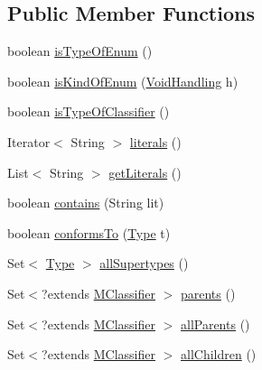 \subsection*{Public Member Functions}
\begin{DoxyCompactItemize}
\item 
boolean \hyperlink{classorg_1_1tzi_1_1use_1_1uml_1_1ocl_1_1type_1_1_enum_type_ae8f0daa3894369910d2a4749cc2b0f83}{is\-Type\-Of\-Enum} ()
\item 
boolean \hyperlink{classorg_1_1tzi_1_1use_1_1uml_1_1ocl_1_1type_1_1_enum_type_a889d3fceea727e072ff199fd786c298f}{is\-Kind\-Of\-Enum} (\hyperlink{enumorg_1_1tzi_1_1use_1_1uml_1_1ocl_1_1type_1_1_type_1_1_void_handling}{Void\-Handling} h)
\item 
boolean \hyperlink{classorg_1_1tzi_1_1use_1_1uml_1_1ocl_1_1type_1_1_enum_type_a807576cf233150cf791f642be43ac423}{is\-Type\-Of\-Classifier} ()
\item 
Iterator$<$ String $>$ \hyperlink{classorg_1_1tzi_1_1use_1_1uml_1_1ocl_1_1type_1_1_enum_type_aecbe55da61a60059f21641fc7b341079}{literals} ()
\item 
List$<$ String $>$ \hyperlink{classorg_1_1tzi_1_1use_1_1uml_1_1ocl_1_1type_1_1_enum_type_a4abd604844fa7746682e0de826368fe6}{get\-Literals} ()
\item 
boolean \hyperlink{classorg_1_1tzi_1_1use_1_1uml_1_1ocl_1_1type_1_1_enum_type_a0996cdc9b8a826cb3a49adc59bbbe194}{contains} (String lit)
\item 
boolean \hyperlink{classorg_1_1tzi_1_1use_1_1uml_1_1ocl_1_1type_1_1_enum_type_a03d9a2fc04a42e03247f7a7f462216ec}{conforms\-To} (\hyperlink{interfaceorg_1_1tzi_1_1use_1_1uml_1_1ocl_1_1type_1_1_type}{Type} t)
\item 
Set$<$ \hyperlink{interfaceorg_1_1tzi_1_1use_1_1uml_1_1ocl_1_1type_1_1_type}{Type} $>$ \hyperlink{classorg_1_1tzi_1_1use_1_1uml_1_1ocl_1_1type_1_1_enum_type_ab045b41876bebee83db4828508d1dacb}{all\-Supertypes} ()
\item 
Set$<$?extends \hyperlink{interfaceorg_1_1tzi_1_1use_1_1uml_1_1mm_1_1_m_classifier}{M\-Classifier} $>$ \hyperlink{classorg_1_1tzi_1_1use_1_1uml_1_1ocl_1_1type_1_1_enum_type_af66e823107a4ea60aaba62cca146c895}{parents} ()
\item 
Set$<$?extends \hyperlink{interfaceorg_1_1tzi_1_1use_1_1uml_1_1mm_1_1_m_classifier}{M\-Classifier} $>$ \hyperlink{classorg_1_1tzi_1_1use_1_1uml_1_1ocl_1_1type_1_1_enum_type_ac9c30f1adfd6ead231efee1a6b3e3522}{all\-Parents} ()
\item 
Set$<$?extends \hyperlink{interfaceorg_1_1tzi_1_1use_1_1uml_1_1mm_1_1_m_classifier}{M\-Classifier} $>$ \hyperlink{classorg_1_1tzi_1_1use_1_1uml_1_1ocl_1_1type_1_1_enum_type_af3d58e8ad2e2e6606491e8de4b353cf6}{all\-Children} ()

\end{DoxyCompactItemize}
